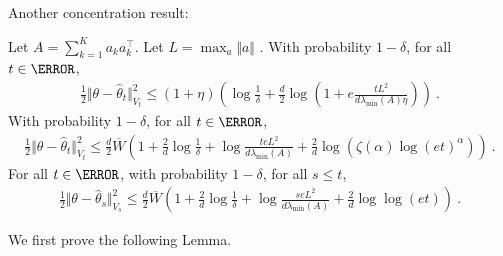 
Another concentration result:
\begin{theorem}
Let $A = \sum_{k=1}^K a_k a_k^\top$. Let $L = \max_a \Vert a \Vert$ . With probability $1- \delta$, for all $t\in \N$,
\begin{align*}
\frac{1}{2}\Vert \theta - \hat{\theta}_t \Vert_{V_t}^2
\le (1+\eta)\left(
	\log\frac{1}{\delta}
	+ \frac{d}{2}\log\left( 1 + e\frac{t L^2}{d \lambda_{\min}(A) \eta} \right)
\right) \: .
\end{align*}
With probability $1- \delta$, for all $t\in \N$,
\begin{align*}
\frac{1}{2}\Vert \theta - \hat{\theta}_t \Vert_{V_t}^2
\le \frac{d}{2}\overline{W}\left(
	1 + \frac{2}{d}\log\frac{1}{\delta}
	+ \log \frac{t e L^2}{d \lambda_{\min}(A) }
	+ \frac{2}{d}\log(\zeta(\alpha)\log(et)^\alpha)
 \right) \: .
\end{align*}
For all $t\in\N$, with probability $1- \delta$, for all $s\le t$,
\begin{align*}
\frac{1}{2}\Vert \theta - \hat{\theta}_s \Vert_{V_s}^2
\le \frac{d}{2}\overline{W}\left(
	1 + \frac{2}{d}\log\frac{1}{\delta}
	+ \log \frac{s e L^2}{d \lambda_{\min}(A) }
	+ \frac{2}{d}\log\log(et)
 \right) \: .
\end{align*}
\end{theorem}

We first prove the following Lemma.

